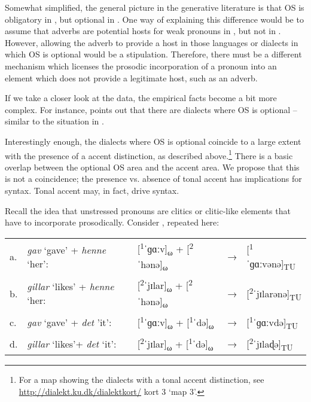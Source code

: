 \documentclass[output=paper]{LSP/langsci}
\begin{document}
Somewhat simplified, the general picture in the generative literature is that OS is obligatory in , but optional in  \citep{Josefsson2003,Josefsson2010}. One way of explaining this difference would be to assume that adverbs are potential hosts for weak pronouns in , but not in . However, allowing the adverb to provide a host in those languages or dialects in which OS is optional would be a stipulation. Therefore, there must be a different mechanism which licenses the prosodic incorporation of a pronoun into an element which does not provide a legitimate host, such as an adverb. 

If we take a closer look at the data, the empirical facts become a bit more complex. For instance, \citet{Pedersen1993} points out that there are  dialects where OS is optional – similar to the situation in . 

Interestingly enough, the dialects where OS is optional coincide to a large extent with the presence of a  accent distinction, as described above.\footnote{For a map showing the  dialects with a tonal accent distinction, see \url{http://dialekt.ku.dk/dialektkort/} kort 3 `map 3’.} There is a basic overlap between the optional OS area and the  accent area. We propose that this is not a coincidence; the presence vs. absence of tonal accent has implications for syntax. Tonal accent may, in fact, drive syntax. 

Recall the idea that unstressed pronouns are clitics or clitic-like elements that have to incorporate prosodically. Consider , repeated here:

\begin{exe}%
\begin{tabular}[t]{lllll}
a. & \textit{gav} ‘gave’ + \textit{henne} ‘her’:\textsuperscript{} & [\textsuperscript{1}ˈɡɑːv]\textsubscript{ω} + [\textsuperscript{2}ˈhənə]\textsubscript{ω}  & → & [\textsuperscript{1}ˈɡɑːvənə]\textsubscript{TU} \\
b. & \textit{gillar} ‘likes’ + \textit{henne} ‘her:                & [\textsuperscript{2}ˈjɪlar]\textsubscript{ω} + [\textsuperscript{2}ˈhənə]\textsubscript{ω} & → & [\textsuperscript{2}ˈjɪlarənə]\textsubscript{TU}\\
c. & \textit{gav} ‘gave’ + \textit{det} ’it’:                      & [\textsuperscript{1}ˈɡɑːv]\textsubscript{ω} + [\textsuperscript{1}ˈdə]\textsubscript{ω}    & → & [\textsuperscript{1}ˈɡɑːvdə]\textsubscript{TU}  \\
d. & \textit{gillar} ‘likes’+ \textit{det} ‘it’:                   & [\textsuperscript{2}ˈjɪlar]\textsubscript{ω} + [\textsuperscript{1}ˈdə]\textsubscript{ω}   & → & [\textsuperscript{2}ˈjɪlaɖə]\textsubscript{TU}  \\
\end{tabular}
\end{exe}
\end{document}
